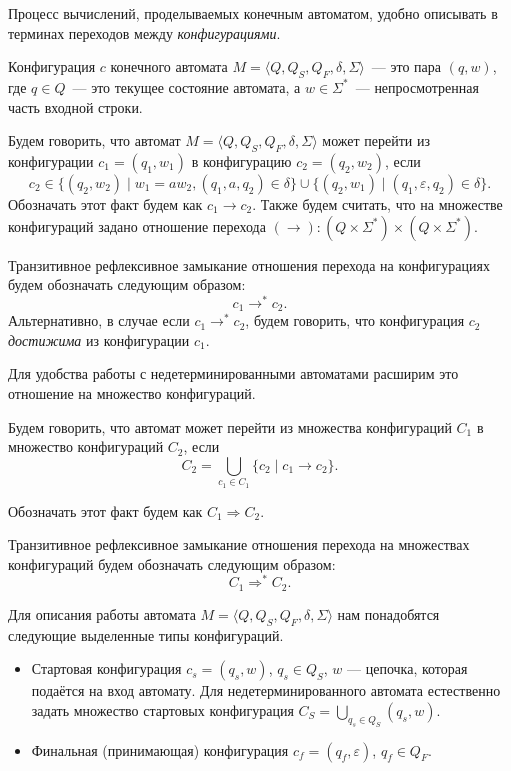 Процесс вычислений, проделываемых конечным автоматом, удобно описывать в терминах переходов между \emph{конфигурациями}.

\begin{definition}[Конфигурация]
    Конфигурация $c$ конечного автомата $M = \langle Q, Q_S, Q_F, \delta, \Sigma \rangle$~--- это пара $(q, w)$, где $q\in Q$~--- это текущее состояние автомата, а $w \in \Sigma^*$~--- непросмотренная часть входной строки.
\end{definition}

\begin{definition}
    Будем говорить, что автомат $M = \langle Q, Q_S, Q_F, \delta, \Sigma \rangle$ может перейти из конфигурации $c_1 = (q_1, w_1)$ в конфигурацию $c_2 = (q_2, w_2)$, если
    \[c_2 \in \{(q_2,w_2) \mid w_1 = aw_2, (q_1,a, q_2) \in \delta\} \cup \{(q_2,w_1) \mid (q_1, \varepsilon, q_2) \in \delta\}.\]
    Обозначать этот факт будем как $c_1 \to c_2$.
    Также будем считать, что на множестве конфигураций задано отношение перехода $(\to):(Q \times \Sigma^*)\times(Q \times \Sigma^*)$.
    
\end{definition}

\begin{definition}
    Транзитивное рефлексивное замыкание отношения перехода на конфигурациях будем обозначать следующим образом: \[ c_1 \to^* c_2. \]
    Альтернативно, в случае если $c_1 \to^* c_2$, будем говорить, что конфигурация $c_2$ \textit{достижима} из конфигурации $c_1$.
\end{definition}

Для удобства работы с недетерминированными автоматами расширим это отношение на множество конфигураций.

\begin{definition}
Будем говорить, что автомат может перейти из множества конфигураций $C_1$ в множество конфигураций $C_2$, если 
\[C_2 = \bigcup_{c_1 \in C_1} \{c_2 \mid c_1 \to c_2 \}.\]

Обозначать этот факт будем как  $C_1 \Rightarrow C_2 $.
\end{definition}

\begin{definition}
Транзитивное рефлексивное замыкание отношения перехода на множествах конфигураций будем обозначать следующим образом: \[ C_1 \Rightarrow^* C_2. \]
\end{definition}

Для описания работы автомата $M = \langle Q, Q_S, Q_F, \delta, \Sigma \rangle$ нам понадобятся следующие выделенные типы конфигураций.
\begin{itemize}
    \item Стартовая конфигурация $c_s = (q_s,w)$, $q_s \in Q_S$, $w$ --- цепочка, которая подаётся на вход автомату. 
    Для недетерминированного автомата естественно задать множество стартовых конфигурация $C_S = \bigcup_{q_s \in Q_S} (q_s,w)$.
    \item Финальная (принимающая) конфигурация $c_f = (q_f,\varepsilon)$, $q_f \in Q_F$.
\end{itemize}

